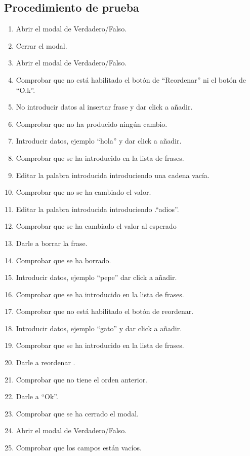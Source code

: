 \subsection{Procedimiento de prueba}
\label{procedimientoPruebas:v/f}
\begin{enumerate}
    \item Abrir el modal de Verdadero/Falso.
    \item Cerrar el modal.
    \item Abrir el modal de Verdadero/Falso.
    \item Comprobar que no está habilitado el botón de ``Reordenar'' ni el botón de ``O.k''.
    \item No introducir datos al insertar frase y dar click a añadir.
    \item Comprobar que no ha producido ningún cambio.
    \item Introducir datos, ejemplo ``hola''  y dar click a añadir.
    \item Comprobar que se ha introducido en la lista de frases.
    \item Editar la palabra introducida introduciendo una cadena vacía.
    \item Comprobar que no se ha cambiado el valor.
    \item Editar la palabra introducida introduciendo .“adios”.
    \item Comprobar que se ha cambiado el valor al esperado
    \item Darle a borrar la frase.
    \item Comprobar que se ha borrado.
    \item Introducir datos, ejemplo ``pepe'' dar click a añadir.
    \item Comprobar que se ha introducido en la lista de frases.
    \item Comprobar que no está habilitado el botón de reordenar.
    \item Introducir datos, ejemplo ``gato'' y dar click a añadir.
    \item Comprobar que se ha introducido en la lista de frases.
    \item Darle a reordenar .
    \item Comprobar que no tiene el orden anterior.
    \item Darle a ``Ok''.
    \item Comprobar que se ha cerrado el modal.
    \item Abrir el modal de Verdadero/Falso.
    \item Comprobar que los campos están vacíos.
\end{enumerate}

